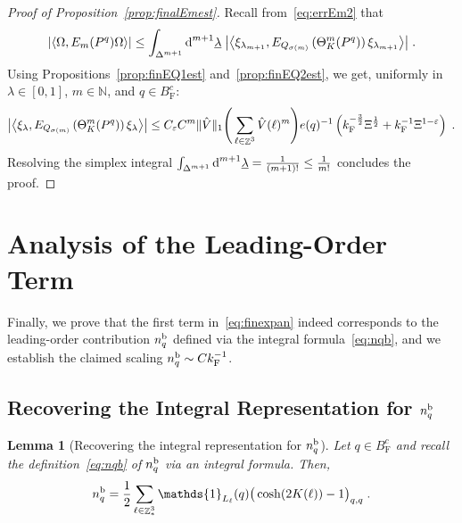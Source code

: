 \documentclass[12pt,a4paper]{article}
\numberwithin{equation}{section}
\newcommand{\1}{\mathbb{I}}
\renewcommand{\b}{\textnormal{b}}
\newcommand{\di}{\textnormal{d}}
\newcommand{\F}{\mathrm{F}}
\DeclareMathOperator{\Z}{\mathbb{Z}}
\newcommand{\half}{\frac{1}{2}}
\newcommand{\eva}[1]{\left\langle #1 \right\rangle}
\theoremstyle{plain}
\newtheorem{lemma}[theorem]{Lemma}
\theoremstyle{definition}
\theoremstyle{remark}
\theoremstyle{plain}
\theoremstyle{definition}
\theoremstyle{remark}
\begin{document}
\begin{proof}[Proof of Proposition~\ref{prop:finalEmest}]
Recall from~\eqref{eq:errEm2} that
\begin{equation}
	\abs{\eva{\Omega, E_m(P^q) \Omega }}
	\le \int_{\Delta^{m+1}} \di^{m+1}\underline{\lambda} \;
		\abs{\eva{\xi_{\lambda_{m+1}}, E_{Q_{\sigma(m)}}\left(\Theta^{m}_{K}(P^q)\right) \xi_{\lambda_{m+1}}}} \;.
\end{equation}		
Using Propositions~\ref{prop:finEQ1est} and~\ref{prop:finEQ2est}, we get, uniformly in $ \lambda \in [0,1] $, $ m \in \mathbb{N} $, and $ q \in B_{\F}^c $:
\begin{equation}
	\abs{\eva{\xi_\lambda, E_{Q_{\sigma(m)}}\left(\Theta^{m}_{K}(P^q)\right) \xi_\lambda}}
	\le C_\varepsilon C^m \Vert \hat{V} \Vert_1
		\Bigg( \sum_{\ell \in \Z^3} \hat{V}(\ell)^m \Bigg)
		e(q)^{-1} \left( k_{\F}^{-\frac{3}{2}} \Xi^\half
		+ k_{\F}^{-1}\Xi^{1-\varepsilon} \right) \;.
\end{equation}
Resolving the simplex integral $ \int_{\Delta^{m+1}} \di^{m+1} \underline{\lambda} = \frac{1}{(m+1)!} \le \frac{1}{m!} $ concludes the proof.
\end{proof}



\section{Analysis of the Leading-Order Term}
\label{sec:leading_order_analysis}


Finally, we prove that the first term in~\eqref{eq:finexpan} indeed corresponds to the leading-order contribution $ n_q^{\b} $ defined via the integral formula~\eqref{eq:nqb}, and we establish the claimed scaling $ n_q^{\b} \sim C k_{\F}^{-1} $.


\subsection{Recovering the Integral Representation for $ n_q^{\b} $}

\begin{lemma}[Recovering the integral representation for $ n_q^{\b} $] \label{lem:nqb_integralrecovery}
Let $q \in B^c_{\F}$ and recall the definition~\eqref{eq:nqb} of $ n_q^{\b} $ via an integral formula. Then,
\begin{equation} \label{eq:nqb_integralrecovery}
	n_q^{\b} = \half\sum\limits_{\ell\in \Z^3_*}\mathds{1}_{L_\ell}(q) \big( \cosh(2K(\ell)) - 1 \big)_{q,q} \;.
\end{equation}
\end{lemma}
\end{document}
